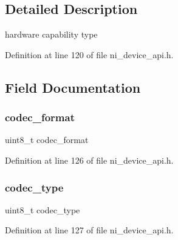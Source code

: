 \subsection{Detailed Description}
hardware capability type 


\begin{DoxyItemize}
\item 
\end{DoxyItemize}

Definition at line 120 of file ni\+\_\+device\+\_\+api.\+h.



\subsection{Field Documentation}
\mbox{\label{struct__ni__hw__capability_a4b58a392a239233c112224c5c6b67b69}} 
\subsubsection{\texorpdfstring{codec\_format}{codec\_format}}
{\footnotesize\ttfamily uint8\+\_\+t codec\+\_\+format}



Definition at line 126 of file ni\+\_\+device\+\_\+api.\+h.

\mbox{\label{struct__ni__hw__capability_a5b16cde76ddd2d653b1c6968e015038d}} 
\subsubsection{\texorpdfstring{codec\_type}{codec\_type}}
{\footnotesize\ttfamily uint8\+\_\+t codec\+\_\+type}



Definition at line 127 of file ni\+\_\+device\+\_\+api.\+h.

\mbox{\label{struct__ni__hw__capability_a93124d2e13be33bebf0974c52bcf4a95}} 
